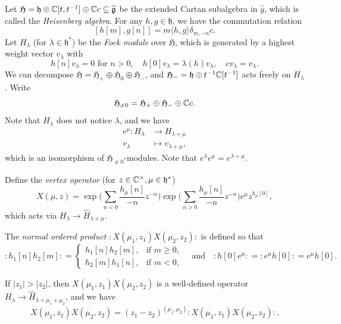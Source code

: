 \begin{remark}
  Let $\mathfrak{H} = \mathfrak{h} \otimes \mathbb{C}[t, t^{-1}] \oplus \mathbb{C} c \subseteq \widehat{\mathfrak{g}}$
  be the extended Cartan subalgebra in
  $\widehat{g}$, which is
  called the \emph{Heisenberg algebra}. For
  any $h, g \in \mathfrak{h}$, we have the
  commutation relation
  \[
    [h[m], g[n]]
    = m \langle h, g \rangle \delta_{m, -n} c.
  \]
  Let $H_\lambda$
  (for $\lambda \in \mathfrak{h}^*$)
  be the \emph{Fock module}
  over $\mathfrak{H}$, which is generated by
  a highest weight vector $v_\lambda$ with
  \[
    h[n] v_\lambda = 0 \text{ for } n > 0, \quad
    h[0] v_\lambda = \lambda(h) v_\lambda, \quad
    c v_\lambda = v_\lambda.
  \]
  We can decompose
  $\mathfrak{H} = \mathfrak{H}_+ \oplus \mathfrak{H}_0 \oplus \mathfrak{H}_-$,
  and $\mathfrak{H}_- = \mathfrak{h} \oplus t^{-1} \mathbb{C}[t^{-1}]$
  acts freely on $H_\lambda$. Write
  \[
    \mathfrak{H}_{\ne 0}
    = \mathfrak{H}_+ \oplus \mathfrak{H}_-
    \oplus \mathbb{C} c.
  \]
  Note that $H_\lambda$ does not
  notice $\lambda$, and we have
  \begin{align*}
    e^\mu
    : H_\lambda
    &\longrightarrow H_{\lambda + \mu} \\
    v_\lambda &\longmapsto v_{\lambda + \mu},
  \end{align*}
  which is an isomorphism of
  $\mathfrak{H}_{\ne 0}$-modules.
  Note that $e^{\lambda} e^\mu = e^{\lambda + \mu}$.

  Define the \emph{vertex operator}
  (for $z \in \mathbb{C}^\times, \mu \in \mathfrak{h}^*$)
  \[
    X(\mu, z)
    = \exp\bigg(
      \sum_{n < 0} \frac{h_\mu[n]}{-n} z^{-n}
    \bigg)
    \exp\bigg(
      \sum_{n > 0} \frac{h_\mu[n]}{-n} z^{-n}
    \bigg)
    e^\mu z^{h_\mu[0]},
  \]
  which acts via
  $H_\lambda \to \widehat{H}_{\lambda + \mu}$.
\end{remark}

\begin{definition}
  The \emph{normal ordered product}
  ${:}X(\mu_1, z_1) X(\mu_2, z_2){:}$ is defined so
  that
  \[
    {:}h_1[n] h_2[m]{:}
    =
    \begin{cases}
      h_1[n] h_2[m], & \text{if } m \ge 0, \\
      h_2[m] h_1[n], & \text{if } m < 0,
    \end{cases}
    \quad \text{and} \quad
    {:}h[0] e^\mu{:} = {:}e^\mu h[0] {:}
    = e^\mu h[0].
  \]
\end{definition}

\begin{prop}
  If $|z_1| > |z_2|$, then
  $X(\mu_1, z_1) X(\mu_2, z_2)$ is a
  well-defined operator
  $H_\lambda \to \widehat{H}_{\lambda + \mu_1 + \mu_2}$, and
  we have
  \[
    X(\mu_1, z_1) X(\mu_2, z_2)
    = (z_1 - z_2)^{(\mu_1, \mu_2)}
    {:}X(\mu_1, z_1) X(\mu_2, z_2){:}.
  \]
\end{prop}

